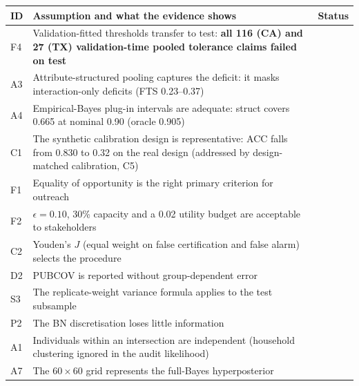 \documentclass[10pt]{article}
\newcommand{\viol}{\colorbox{red!20}{\status{violated / limitation}}}
\newcommand{\valj}{\colorbox{blue!12}{\status{value judgement}}}
\newcommand{\untested}{\colorbox{gray!20}{\status{untested}}}
\begin{document}
\begin{center}\small
\begin{tabularx}{\textwidth}{@{}lXl@{}}
\toprule
ID & Assumption and what the evidence shows & Status \\
\midrule
F4 & Validation-fitted thresholds transfer to test: \textbf{all 116 (CA) and 27 (TX) validation-time pooled tolerance claims failed on test} & \viol \\
A3 & Attribute-structured pooling captures the deficit: it masks interaction-only deficits (FTS 0.23--0.37) & \viol \\
A4 & Empirical-Bayes plug-in intervals are adequate: struct covers 0.665 at nominal 0.90 (oracle 0.905) & \viol \\
C1 & The synthetic calibration design is representative: ACC falls from 0.830 to 0.32 on the real design (addressed by design-matched calibration, C5) & \viol \\
F1 & Equality of opportunity is the right primary criterion for outreach & \valj \\
F2 & $\epsilon=0.10$, 30\% capacity and a 0.02 utility budget are acceptable to stakeholders & \valj \\
C2 & Youden's $J$ (equal weight on false certification and false alarm) selects the procedure & \valj \\
D2 & PUBCOV is reported without group-dependent error & \untested \\
S3 & The replicate-weight variance formula applies to the test subsample & \untested \\
P2 & The BN discretisation loses little information & \untested \\
A1 & Individuals within an intersection are independent (household clustering ignored in the audit likelihood) & \untested \\
A7 & The $60\times60$ grid represents the full-Bayes hyperposterior & \untested \\
\bottomrule
\end{tabularx}
\end{center}
\end{document}
